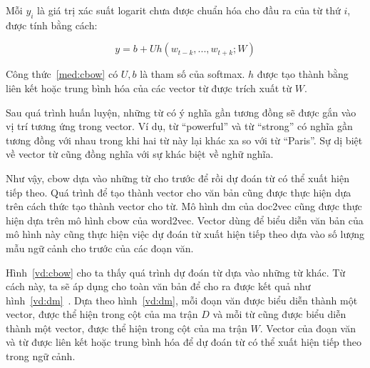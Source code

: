 Mỗi $y_i$ là giá trị xác suất logarit chưa được chuẩn hóa cho đầu ra của từ thứ $i$, được tính bằng cách:
\begin{center}
\begin{equation}
y = b + Uh(w_{t-k}, ..., w_{t+k}; W)
\end{equation}
\label{med:cbow}
\end{center}

Công thức~\ref{med:cbow} có $U, b$ là tham số của softmax.
$h$ được tạo thành bằng liên kết hoặc trung bình hóa của các vector từ được trích xuất từ $W$.

Sau quá trình huấn luyện, những từ có ý nghĩa gần tương đồng sẽ được gắn vào vị trí tương ứng trong vector.
Ví dụ, từ ``powerful'' và từ ``strong'' có nghĩa gần tương đồng với nhau trong khi hai từ này lại khác xa so với từ ``Paris''.
Sự dị biệt về vector từ cũng đồng nghĩa với sự khác biệt về nghữ nghĩa.

Như vậy, cbow dựa vào những từ cho trước để rồi dự đoán từ có thể xuất hiện tiếp theo.
Quá trình để tạo thành vector cho văn bản cũng được thực hiện dựa trên cách thức tạo thành vector cho từ.
Mô hình dm của doc2vec cũng được thực hiện dựa trên mô hình cbow của word2vec.
Vector dùng để biểu diễn văn bản của mô hình này cũng thực hiện việc dự đoán từ xuất hiện tiếp theo dựa vào số lượng mẫu ngữ cảnh cho trước của các đoạn văn.

Hình~\ref{vd:cbow} cho ta thấy quá trình dự đoán từ dựa vào những từ khác.
Từ cách này, ta sẽ áp dụng cho toàn văn bản để cho ra được kết quả như hình~\ref{vd:dm}~\cite{doc2vec-original}.
Dựa theo hình~\ref{vd:dm}, mỗi đoạn văn được biểu diễn thành một vector, được thể hiện trong cột của ma trận $D$ và mỗi từ cũng được biểu diễn thành một vector, được thể hiện trong cột của ma trận $W$.
Vector của đoạn văn và từ được liên kết hoặc trung bình hóa để dự đoán từ có thể xuất hiện tiếp theo trong ngữ cảnh.


